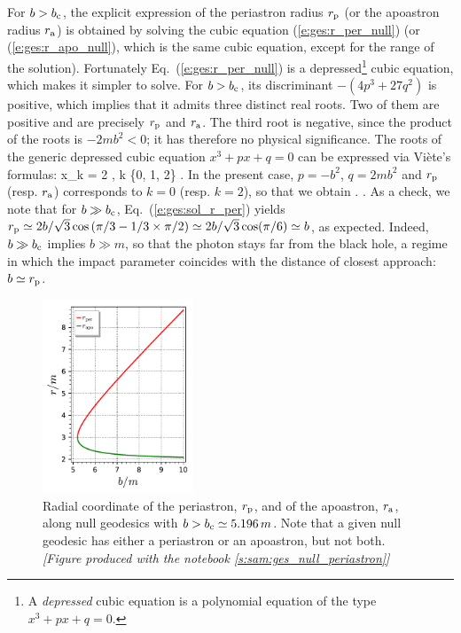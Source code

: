 For $b > b_{\rm c}$, the explicit expression of the periastron radius
$r_{\rm p}$ (or the apoastron radius $r_{\rm a}$)
is obtained by solving the cubic equation (\ref{e:ges:r_per_null})
(or (\ref{e:ges:r_apo_null}), which is the same cubic equation, except for
the range of the solution). Fortunately Eq.~(\ref{e:ges:r_per_null})
is a depressed\footnote{A \emph{depressed} cubic equation is a polynomial equation
of the type $x^3 + p x + q = 0$.} cubic equation, which makes
it simpler to solve. For $b > b_{\rm c}$, its discriminant $-(4 p^3 + 27 q^2)$
is positive, which
implies that it admits three distinct real roots. Two of them are positive
and are precisely $r_{\rm p}$ and $r_{\rm a}$. The third root is negative,
since the product of the roots is $-2mb^2 < 0$; it has therefore no
physical significance. The roots of the generic depressed cubic
equation $x^3 + p x + q = 0$ can be expressed via Viète's formulas:
\be \label{e:gis:Viete}
    x_k = 2  \cos {},
        \qquad k \in \{0, 1, 2\} .
\ee
In the present case, $p= - b^2$, $q = 2 m b^2$
and $r_{\rm p}$ (resp. $r_{\rm a}$) corresponds to $k=0$
(resp. $k=2$), so that we obtain
\be \label{e:ges:sol_r_per}
  .
\ee
\be \label{e:ges:sol_r_apo}
   .
\ee
As a check, we note that for $b\gg b_{\rm c}$, Eq.~(\ref{e:ges:sol_r_per})
yields $r_{\rm p} \simeq 2b/\sqrt{3} \cos\left(\pi/3 -1/3 \times \pi/2 \right)
\simeq 2b/\sqrt{3} \cos(\pi/6) \simeq b$, as expected. Indeed, $b\gg b_{\rm c}$
implies $b \gg m$, so that the photon stays far from the black hole, a regime
in which the impact parameter coincides with the distance of closest approach:
$b \simeq r_{\rm p}$.

\begin{figure}
\centerline{\includegraphics[width=0.4\textwidth]{ges_null_per_apo.pdf}}
\caption[]{\label{f:gis:null_per_apo} \footnotesize
Radial coordinate of the periastron, $r_{\rm p}$, and of the apoastron,
$r_{\rm a}$, along null geodesics with $b > b_{\rm c} \simeq 5.196\, m$.
Note that a given null geodesic has either a periastron or an apoastron, but not
both. \textsl{[Figure produced with the notebook \ref{s:sam:ges_null_periastron}]}
}
\end{figure}

